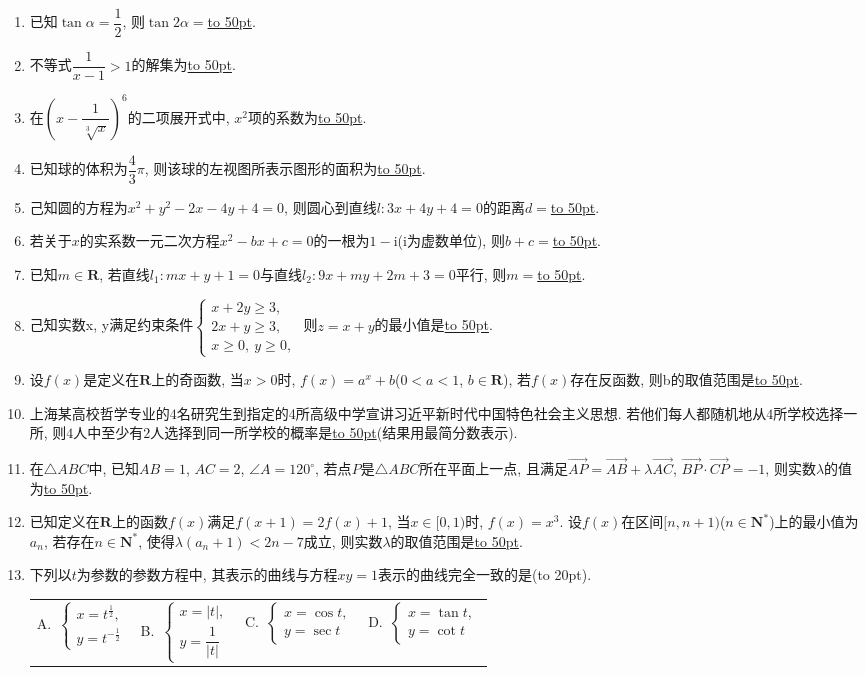 \documentclass[10pt,a4paper]{article}
\newcommand{\blank}[1]{\underline{\hbox to #1pt{}}}
\newcommand{\bracket}[1]{(\hbox to #1pt{})}
\newcommand{\fourch}[4]{\par\begin{tabular}{p{.23\textwidth}p{.23\textwidth}p{.23\textwidth}p{.23\textwidth}}
A.~#1 &B.~#2& C.~#3& D.~#4
\end{tabular}}
\begin{document}
\begin{enumerate}[1.]

\item 已知$\tan \alpha =\dfrac 12$, 则$\tan 2\alpha =$\blank{50}.
\item 不等式$\dfrac 1{x-1}>1$的解集为\blank{50}.
\item 在$(x-\dfrac 1{\sqrt[3]x})^6$的二项展开式中, $x^2$项的系数为\blank{50}.
\item 已知球的体积为$\dfrac 43\pi$, 则该球的左视图所表示图形的面积为\blank{50}.
\item 己知圆的方程为$x^2+y^2-2x-4y+4=0$, 则圆心到直线$l:3x+4y+4=0$的距离$d=$\blank{50}.
\item 若关于$x$的实系数一元二次方程$x^2-bx+c=0$的一根为$1-\mathrm{i}$($\mathrm{i}$为虚数单位), 则$b+c=$\blank{50}.
\item 已知$m\in \mathbf{R}$, 若直线$l_1:mx+y+1=0$与直线$l_2:9x+my+2m+3=0$平行, 则$m=$\blank{50}.
\item 己知实数x, y满足约束条件$\begin{cases} x+2y\ge 3, \\ 2x+y\ge 3, \\ x\ge 0, \ y\ge 0, \end{cases}$ 则$z=x+y$的最小值是\blank{50}.
\item 设$f(x)$是定义在$\mathbf{R}$上的奇函数, 当$x>0$时, $f(x)=a^x+b$($0<a<1$, $b\in \mathbf{R}$), 若$f(x)$存在反函数, 则b的取值范围是\blank{50}.
\item 上海某高校哲学专业的$4$名研究生到指定的4所高级中学宣讲习近平新时代中国特色社会主义思想. 若他们每人都随机地从$4$所学校选择一所, 则$4$人中至少有$2$人选择到同一所学校的概率是\blank{50}(结果用最简分数表示).
\item 在$\triangle ABC$中, 已知$AB=1$, $AC=2$, $\angle A=120^\circ$, 若点$P$是$\triangle ABC$所在平面上一点, 且满足$\overrightarrow{AP}=\overrightarrow{AB}+\lambda \overrightarrow{AC}$, $\overrightarrow{BP}\cdot \overrightarrow{CP}=-1$, 则实数$\lambda$的值为\blank{50}.
\item 已知定义在$\mathbf{R}$上的函数$f(x)$满足$f(x+1)=2f(x)+1$, 当$x\in [0,1)$时, $f(x)=x^3$. 设$f(x)$在区间$[n,n+1)$($n\in \mathbf{N}^*$)上的最小值为$a_n$, 若存在$n\in \mathbf{N}^*$, 使得$\lambda (a_n+1)<2n-7$成立, 则实数$\lambda$的取值范围是\blank{50}.
\item 下列以$t$为参数的参数方程中, 其表示的曲线与方程$xy=1$表示的曲线完全一致的是\bracket{20}.
\fourch{$\begin{cases} x={t^{\frac 12}}, \\ y={t^{-\frac 12}} \end{cases}$}{$\begin{cases} x=|t|, \\ y=\dfrac 1{|t|} \end{cases}$}{$\begin{cases} x=\cos t, \\ y=\sec t \end{cases}$}{$\begin{cases}  x=\tan t, \\ y=\cot t \end{cases}$}

\end{enumerate}
\end{document}
